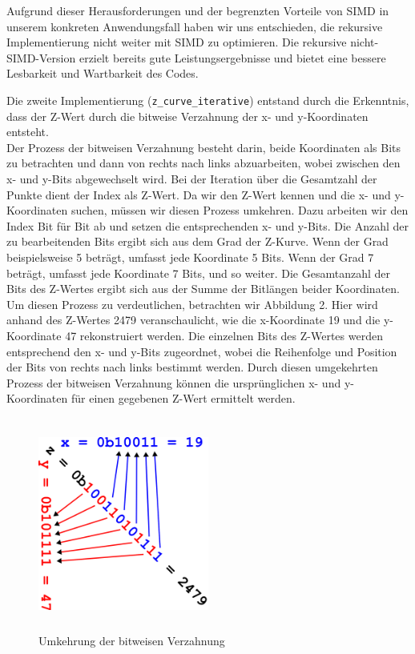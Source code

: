 \documentclass[course=erap]{aspdoc}
\begin{document}
\noindent Aufgrund dieser Herausforderungen und der begrenzten Vorteile von SIMD in unserem konkreten Anwendungsfall haben wir uns entschieden, die rekursive Implementierung nicht weiter mit SIMD zu optimieren. Die rekursive nicht-SIMD-Version erzielt bereits gute Leistungsergebnisse und bietet eine bessere Lesbarkeit und Wartbarkeit des Codes.

\noindent Die zweite Implementierung (\texttt{z\_curve\_iterative}) entstand durch die Erkenntnis, dass der Z-Wert durch die bitweise Verzahnung der x- und y-Koordinaten entsteht. \\
Der Prozess der bitweisen Verzahnung besteht darin, beide Koordinaten als Bits zu betrachten und dann von rechts nach links abzuarbeiten, wobei zwischen den x- und y-Bits abgewechselt wird. Bei der Iteration über die Gesamtzahl der Punkte dient der Index als Z-Wert. Da wir den Z-Wert kennen und die x- und y-Koordinaten suchen, müssen wir diesen Prozess umkehren. Dazu arbeiten wir den Index Bit für Bit ab und setzen die entsprechenden x- und y-Bits. Die Anzahl der zu bearbeitenden Bits ergibt sich aus dem Grad der Z-Kurve. Wenn der Grad beispielsweise 5 beträgt, umfasst jede Koordinate 5 Bits. Wenn der Grad 7 beträgt, umfasst jede Koordinate 7 Bits, und so weiter. Die Gesamtanzahl der Bits des Z-Wertes ergibt sich aus der Summe der Bitlängen beider Koordinaten.\\
Um diesen Prozess zu verdeutlichen, betrachten wir Abbildung 2. Hier wird anhand des Z-Wertes 2479 veranschaulicht, wie die x-Koordinate 19 und die y-Koordinate 47 rekonstruiert werden. Die einzelnen Bits des Z-Wertes werden entsprechend den x- und y-Bits zugeordnet, wobei die Reihenfolge und Position der Bits von rechts nach links bestimmt werden. Durch diesen umgekehrten Prozess der bitweisen Verzahnung können die ursprünglichen x- und y-Koordinaten für einen gegebenen Z-Wert ermittelt werden.
\setlength{\parskip}{1em}

\begin{figure}[H]
        \centering
        \includegraphics[width=0.5\textwidth, height=7cm]{Bit Interleaving.png}
        \caption{Umkehrung der bitweisen Verzahnung}
        \label{fig:Bit Interleaving}
    \end{figure}
\end{document}
